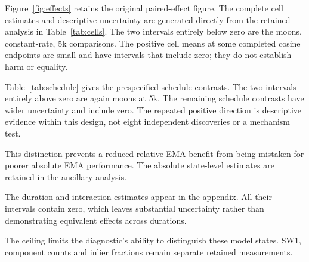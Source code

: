 Figure~\ref{fig:effects} retains the original paired-effect figure. The
complete cell estimates and descriptive uncertainty are generated directly
from the retained analysis in Table~\ref{tab:cells}. The two intervals
entirely below zero are the moons, constant-rate, 5k comparisons. The
positive cell means at some completed cosine endpoints are small and have
intervals that include zero; they do not establish harm or equality.


Table~\ref{tab:schedule} gives the prespecified schedule contrasts. The
two intervals entirely above zero are again moons at 5k. The remaining
schedule contrasts have wider uncertainty and include zero. The repeated
positive direction is descriptive evidence within this design, not eight
independent discoveries or a mechanism test.

This distinction prevents a reduced relative EMA benefit from being
mistaken for poorer absolute EMA performance. The absolute state-level
estimates are retained in the ancillary analysis.

The duration and interaction estimates appear in the appendix. All their
intervals contain zero, which leaves substantial uncertainty rather than
demonstrating equivalent effects across durations.

The ceiling limits the diagnostic's ability to distinguish these model
states. SW1, component counts and inlier fractions remain separate retained
measurements.

